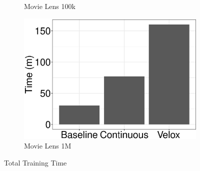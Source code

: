 \documentclass[10pt,conference,letterpaper]{IEEEtran}
\begin{document}
\begin{figure}[h]
\begin{subfigure}[b]{0.2\textwidth}
	\caption{Movie Lens 100k}
	\label{fig:movie-lens-100k-times}
\end{subfigure}%
\begin{subfigure}[b]{0.2\textwidth}
  	\includegraphics[width=\linewidth, height=\linewidth,keepaspectratio]{../images/experiment-results/movie-lens-1M-times.eps}
	\caption{Movie Lens 1M}
	\label{fig:movie-lens-1M-times}
\end{subfigure}%
\vspace{2mm}
\caption{Total Training Time}
 \label{fig:local-training-time}
\end{figure}
\end{document}
